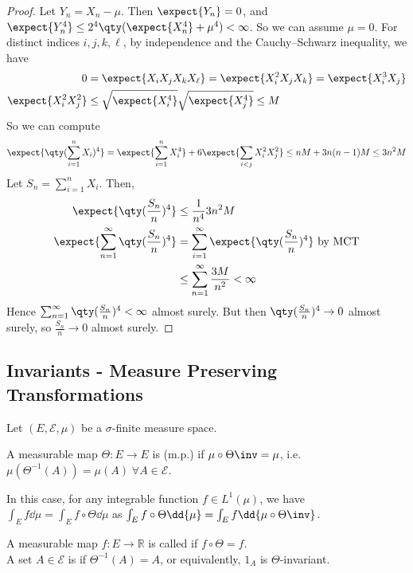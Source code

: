 \begin{proof}
	Let $Y_n = X_n - \mu$.
	Then $\expect{Y_n} = 0$, and $\expect{Y_n^4} \leq 2^4 \qty(\expect{X_n^4} + \mu^4) < \infty$.
	So we can assume $\mu = 0$.
	For distinct indices $i, j, k, \ell$, by independence and the Cauchy--Schwarz inequality, we have
	\begin{align*}
        0 &= \expect{X_i X_j X_k X_\ell} = \expect{X_i^2 X_j X_k} = \expect{X_i^3 X_j} \\
		\expect{X_i^2 X_j^2} &\leq \sqrt{\expect{X_i^4}}\sqrt{\expect{X_j^4}} \leq M
    \end{align*}
	So we can compute
	\begin{align*}
		\expect{\qty(\sum_{i=1}^n X_i)^4} = \expect{\sum_{i=1}^n X_i^4} + 6\expect{\sum_{i < j} X_i^2 X_j^2} \leq nM + 3n(n-1)M \leq 3n^2 M
    \end{align*}
	Let $S_n = \sum_{i=1}^n X_i$.
	Then,
	\begin{align*}
		\expect{\qty(\frac{S_n}{n})^4} &\leq \frac{1}{n^4} 3n^2 M \\
        \expect{\sum_{n=1}^\infty \qty(\frac{S_n}{n})^4} &= \sum_{i=1}^{\infty} \expect{\qty(\frac{S_n}{n})^4} \text{ by MCT} \\
		&\leq \sum_{n=1}^\infty \frac{3M}{n^2} < \infty
    \end{align*}
	Hence $\sum_{n=1}^\infty \qty(\frac{S_n}{n})^4 < \infty$ almost surely.
	But then $\qty(\frac{S_n}{n})^4 \to 0$ almost surely, so $\frac{S_n}{n} \to 0$ almost surely.
\end{proof}

\subsection{Invariants - Measure Preserving Transformations}

Let $(E, \mathcal E, \mu)$ be a $\sigma$-finite measure space.

\begin{definition}
	A measurable map $\Theta \colon E \to E$ is  (m.p.) if $\mu \circ \Theta\inv = \mu$, i.e. $\mu(\Theta^{-1}(A)) = \mu(A) \; \forall A \in \mathcal E$.
\end{definition}

In this case, for any integrable function $f \in L^1(\mu)$, we have $\int_E f \dd{\mu} = \int_E f \circ \Theta \dd{\mu}$ as $\int_E f \circ \Theta \dd{\mu} = \int_E f \dd{\mu \circ \Theta\inv}$.

\begin{definition}
	A measurable map $f \colon E \to \mathbb R$ is called  if $f \circ \Theta = f$. \\
	A set $A \in \mathcal E$ is  if $\Theta^{-1}(A) = A$, or equivalently, $1_A$ is $\Theta$-invariant.
\end{definition}

